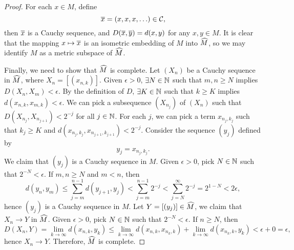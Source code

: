 \begin{thm}
\begin{proof}
        For each $x\in M$, define
        \[
        \Bar x = (x, x, x, \ldots) \in \mathcal C,
        \]
        then $\Bar x$ is a Cauchy sequence, and $D(\Bar x, \Bar y) = d(x, y)$ for any $x, y\in M$. It is clear that the mapping $x\mapsto \Bar x$ is an isometric embedding of $M$ into $\Hat M$, so we may identify $M$ as a metric subspace of $\Hat M$.

        Finally, we need to show that $\Hat M$ is complete. Let $(X_n)$ be a Cauchy sequence in $\Hat M$, where $X_n = [(x_{n, k})]$. Given $\epsilon > 0$, $\exists N\in \N$ such that $m, n \geq N$ implies $D(X_n, X_m) < \epsilon$. By the definition of $D$, $\exists K\in \N$ such that $k \geq K$ implies $d(x_{n, k}, x_{m, k}) < \epsilon$. We can pick a subsequence $(X_{n_j})$ of $(X_n)$ such that $D(X_{n_j}, X_{n_{j+1}}) < 2^{-j}$ for all $j\in \N$. For each $j$, we can pick a term $x_{n_j, k_j}$ such that $k_j \geq K$ and $d(x_{n_j, k_j}, x_{n_{j+1}, k_{j+1}}) < 2^{-j}$. Consider the sequence $(y_j)$ defined by
        \[
        y_j = x_{n_j, k_j}.
        \] We claim that $(y_j)$ is a Cauchy sequence in $M$. Given $\epsilon > 0$, pick $N\in \N$ such that $2^{-N} < \epsilon$. If $m, n \geq N$ and $m < n$, then
        \[
        d(y_n, y_m) \leq \sum_{j=m}^{n-1} d(y_{j+1}, y_j) < \sum_{j=m}^{n-1} 2^{-j} < \sum_{j=N}^\infty 2^{-j} = 2^{1-N} < 2\epsilon,
        \]
        hence $(y_j)$ is a Cauchy sequence in $M$. Let $Y = [(y_j)] \in \Hat M$, we claim that $X_n \to Y$ in $\Hat M$. Given $\epsilon > 0$, pick $N\in \N$ such that $2^{-N} < \epsilon$. If $n \geq N$, then
        \[
        D(X_n, Y) = \lim_{k\to\infty} d(x_{n, k}, y_k) \leq \lim_{k\to\infty} d(x_{n, k}, x_{n_k, k}) + \lim_{k\to\infty} d(x_{n_k, k}, y_k) < \epsilon + 0 = \epsilon,
        \]
        hence $X_n \to Y$. Therefore, $\Hat M$ is complete.
    \end{proof}
\end{thm}